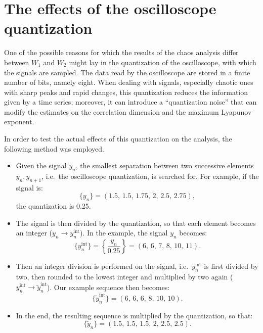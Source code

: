 \section{The effects of the oscilloscope quantization}\label{sec: oscilloscope quantization}

One of the possible reasons for which the results of the chaos analysis differ between $W_1$ and $W_2$
might lay in the quantization of the oscilloscope, with which the signals are sampled.
The data read by the oscilloscope are stored in a finite number of bits, namely eight.
When dealing with signals, especially chaotic ones with sharp peaks and rapid changes,
this quantization reduces the information given by a time series; moreover, it can introduce
a ``quantization noise'' that can modify the estimates on the correlation dimension and the maximum
Lyapunov exponent.

In order to test the actual effects of this quantization on the analysis, the following method was
employed.
\begin{itemize}
    \item
    Given the signal $y_n$, the smallest separation between two successive elements
    $y_n,y_{n+1}$, i.e.\ the oscilloscope quantization, is searched for.
    For example, if the signal is:
    \begin{equation*}
        \{y_n\}=(1.5,\,1.5,\,1.75,\,2,\,2.5,\,2.75),
    \end{equation*}
    the quantization is 0.25.

    \item
    The signal is then divided by the quantization, so that each element becomes an integer
    ($y_n\rightarrow y_n^{\text{int}}$).
    In the example, the signal $y_n$ becomes:
    \begin{equation*}
        \{y_n^{\text{int}}\}=\left\{\frac{y_n}{0.25}\right\}=(6,\,6,\,7,\,8,\,10,\,11).
    \end{equation*}

    \item
    Then an integer division is performed on the signal, i.e.\ $y_n^{\text{int}}$ is first divided
    by two, then rounded to the lowest integer and multiplied by two again
    ($y_n^{\text{int}}\rightarrow \tilde{y}_n^{\text{int}}$).
    Our example sequence then becomes:
    \begin{equation*}
        \{\tilde{y}_n^{\text{int}}\}=(6,\,6,\,6,\,8,\,10,\,10).
    \end{equation*}

    \item
    In the end, the resulting sequence is multiplied by the quantization, so that:
    \begin{equation*}
        \{\tilde{y}_n\}=(1.5,\,1.5,\,1.5,\,2,\,2.5,\,2.5).
    \end{equation*}
\end{itemize}

